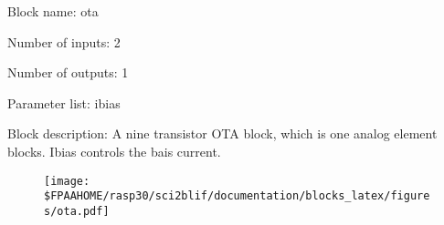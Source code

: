 \pagebreak

Block name: ota

Number of inputs: 2

Number of outputs: 1

Parameter list: ibias

Block description: 
A nine transistor OTA block, which is one analog element blocks. Ibias controls the bais current.

\begin{figure}[H]  %
\texttt{[image: \$FPAAHOME/rasp30/sci2blif/documentation/blocks\_latex/figures/ota.pdf]}
\end{figure}

